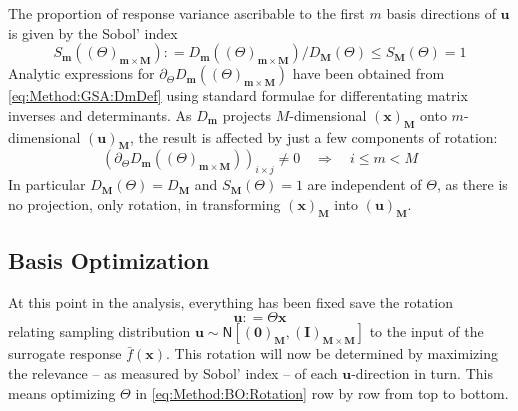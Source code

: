 \documentclass[preprint,12pt]{elsarticle}
\newcommand*{\M}[1]{\ensuremath{#1}\xspace}
\newcommand*{\vr}[1]{\M{\mathbf{#1}}}
\newcommand*{\deq}{\M{\mathrel{\mathop:}=}}
\newcommand*{\gauss}[2]{\mathsf{N}\!\left\lbrack{} #1 , #2 \right\rbrack}
\begin{document}
            The proportion of response variance ascribable to the first $m$ basis directions of $\vr{u}$ is given by the Sobol' index
            \begin{equation} \label{eq:Method:GSA:SDef}
                S_{\vr{m}}((\Theta)_{\vr{m}\times\vr{M}}) \deq D_{\vr{m}}((\Theta)_{\vr{m}\times\vr{M}})/D_{\vr{M}}(\Theta) \leq S_{\vr{M}}(\Theta) = 1
            \end{equation}
            Analytic expressions for $\partial_{\Theta} D_{\vr{m}}((\Theta)_{\vr{m}\times\vr{M}})$ have been obtained from \cref{eq:Method:GSA:DmDef} using standard formulae for differentating matrix inverses and determinants. As $D_{\vr{m}}$ projects $M$-dimensional $(\vr{x})_{\vr{M}}$ onto $m$-dimensional $(\vr{u})_{\vr{M}}$, the result is affected by just a few components of rotation:
            \begin{equation} \label{eq:Method:GSA:partialD}
                \left(\partial_{\Theta} D_{\vr{m}}((\Theta)_{\vr{m}\times\vr{M}})\right)_{i \times j} \neq 0 \quad \Longrightarrow \quad i \leq m < M
            \end{equation}
            In particular $D_{\vr{M}}(\Theta)=D_{\vr{M}}$ and $S_{\vr{M}}(\Theta)=1$ are independent of $\Theta$, as there is no projection, only rotation, in transforming $(\vr{x})_{\vr{M}}$ into $(\vr{u})_{\vr{M}}$.

        \subsection{Basis Optimization} \label{sub:Method:BO}
            At this point in the analysis, everything has been fixed save the rotation
            \begin{equation} \label{eq:Method:BO:Rotation}
                \vr{u} \deq \Theta \vr{x}
            \end{equation}
            relating sampling distribution $\vr{u} \sim \gauss{(\vr{0})_{\vr{M}}}{(\vr{I})_{\vr{M}\times\vr{M}}}$ to the input of the surrogate response $\bar{f}(\vr{x})$. This rotation will now be determined by maximizing the relevance -- as measured by Sobol' index -- of each $\vr{u}$-direction in turn. This means optimizing $\Theta$ in \cref{eq:Method:BO:Rotation} row by row from top to bottom. 
            
\end{document}
